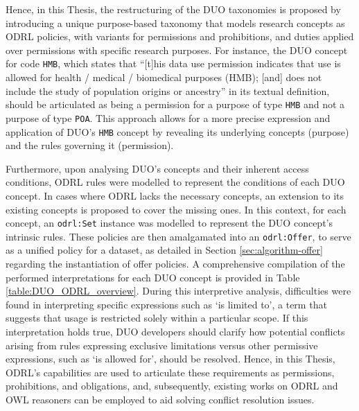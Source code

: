 Hence, in this Thesis, the restructuring of the DUO taxonomies is proposed by introducing a unique purpose-based taxonomy that models research concepts as ODRL policies, with variants for permissions and prohibitions, and duties applied over permissions with specific research purposes.
For instance, the DUO concept for code \texttt{HMB}, which states that ``[t]his data use permission indicates that use is allowed for health / medical / biomedical purposes (HMB); [and] does not include the study of population origins or ancestry'' in its textual definition, should be articulated as being a permission for a purpose of type \texttt{HMB} and not a purpose of type \texttt{POA}.
This approach allows for a more precise expression and application of DUO's \texttt{HMB} concept by revealing its underlying concepts (purpose) and the rules governing it (permission).

Furthermore, upon analysing DUO's concepts and their inherent access conditions, ODRL rules were modelled to represent the conditions of each DUO concept.
In cases where ODRL lacks the necessary concepts, an extension to its existing concepts is proposed to cover the missing ones.
In this context, for each concept, an \texttt{odrl:Set} instance was modelled to represent the DUO concept's intrinsic rules.
These policies are then amalgamated into an \texttt{odrl:Offer}, to serve as a unified policy for a dataset, as detailed in Section \ref{sec:algorithm-offer} regarding the instantiation of offer policies.
A comprehensive compilation of the performed interpretations for each DUO concept is provided in Table \ref{table:DUO_ODRL_overview}.
During this interpretive analysis, difficulties were found in interpreting specific expressions such as `is limited to', a term that suggests that usage is restricted solely within a particular scope.
If this interpretation holds true, DUO developers should clarify how potential conflicts arising from rules expressing exclusive limitations versus other permissive expressions, such as `is allowed for', should be resolved.
Hence, in this Thesis, ODRL's capabilities are used to articulate these requirements as permissions, prohibitions, and obligations, and, subsequently, existing works on ODRL \citep{pellegrini_automated_2018,de_vos_odrl_2019} and OWL \citep{bonatti_realtime_2020} reasoners can be employed to aid solving conflict resolution issues.

